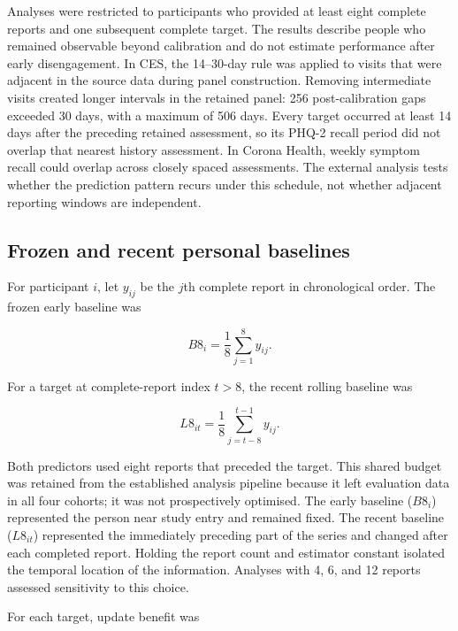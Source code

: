 \documentclass[pdflatex,sn-vancouver-num]{sn-jnl}
\begin{document}
Analyses were restricted to participants who provided at least eight complete reports and one subsequent complete target. The results describe people who remained observable beyond calibration and do not estimate performance after early disengagement. In CES, the 14--30-day rule was applied to visits that were adjacent in the source data during panel construction. Removing intermediate visits created longer intervals in the retained panel: 256 post-calibration gaps exceeded 30 days, with a maximum of 506 days. Every target occurred at least 14 days after the preceding retained assessment, so its PHQ-2 recall period did not overlap that nearest history assessment. In Corona Health, weekly symptom recall could overlap across closely spaced assessments. The external analysis tests whether the prediction pattern recurs under this schedule, not whether adjacent reporting windows are independent.

\subsection{Frozen and recent personal baselines}

For participant $i$, let $y_{ij}$ be the $j$th complete report in chronological order. The frozen early baseline was

\begin{equation}
B8_i = \frac{1}{8}\sum_{j=1}^{8} y_{ij}.
\label{eq:b8}
\end{equation}

For a target at complete-report index $t>8$, the recent rolling baseline was

\begin{equation}
L8_{it} = \frac{1}{8}\sum_{j=t-8}^{t-1} y_{ij}.
\label{eq:l8}
\end{equation}

Both predictors used eight reports that preceded the target. This shared budget was retained from the established analysis pipeline because it left evaluation data in all four cohorts; it was not prospectively optimised. The early baseline ($B8_i$) represented the person near study entry and remained fixed. The recent baseline ($L8_{it}$) represented the immediately preceding part of the series and changed after each completed report. Holding the report count and estimator constant isolated the temporal location of the information. Analyses with 4, 6, and 12 reports assessed sensitivity to this choice.

For each target, update benefit was
\end{document}
